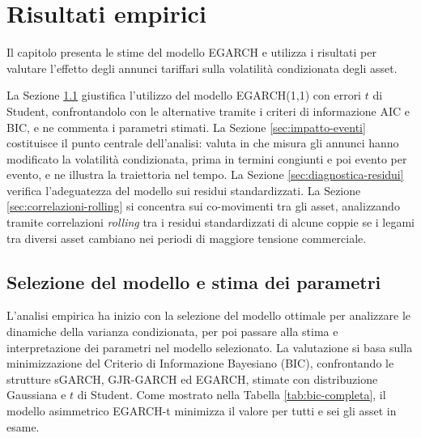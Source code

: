 \chapter{Risultati empirici}
\label{cap:risultati}

Il capitolo presenta le stime del modello EGARCH e utilizza i risultati per valutare l'effetto degli annunci tariffari sulla volatilità condizionata degli asset.

La Sezione \ref{sec:selezione-modello} giustifica l'utilizzo del modello EGARCH(1,1) con errori $t$ di Student, confrontandolo con le alternative tramite i criteri di 
informazione AIC e BIC, e ne commenta i parametri stimati. La Sezione \ref{sec:impatto-eventi} costituisce il punto centrale dell'analisi: valuta in che misura gli annunci 
hanno modificato la volatilità condizionata, prima in termini congiunti e poi evento per evento, e ne illustra la traiettoria nel tempo. La Sezione \ref{sec:diagnostica-residui} 
verifica l'adeguatezza del modello sui residui standardizzati. La Sezione \ref{sec:correlazioni-rolling} si concentra sui co-movimenti tra gli asset, analizzando 
tramite correlazioni \emph{rolling} tra i residui standardizzati di alcune coppie se i legami tra diversi asset cambiano nei periodi di maggiore tensione commerciale.

\section{Selezione del modello e stima dei parametri}
\label{sec:selezione-modello}
L'analisi empirica ha inizio con la selezione del modello ottimale per analizzare le dinamiche della varianza condizionata, per poi passare alla stima e interpretazione 
dei parametri nel modello selezionato. La valutazione si basa sulla minimizzazione del Criterio di Informazione Bayesiano (BIC), confrontando le strutture sGARCH, GJR-GARCH 
ed EGARCH, stimate con distribuzione Gaussiana e $t$ di Student. Come mostrato nella Tabella \ref{tab:bic-completa}, il modello asimmetrico EGARCH-t 
minimizza il valore per tutti e sei gli asset in esame.

